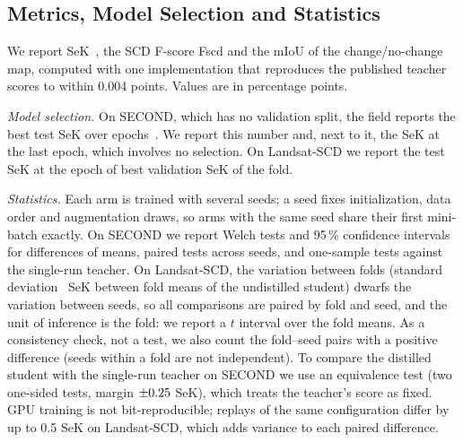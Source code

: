 \documentclass[journal]{IEEEtran}
\begin{document}
\subsection{Metrics, Model Selection and Statistics}
\label{sec:stats}
We report SeK~\cite{yang2022asymmetric}, the SCD F-score Fscd and the mIoU of the
change/no-change map, computed with one implementation that reproduces the published teacher
scores to within 0.004 points. Values are in percentage points.

\emph{Model selection.} On SECOND, which has no validation split, the field reports the best
test SeK over epochs~\cite{chen2024changemamba,shen2026foundation}. We report this number and,
next to it, the SeK at the last epoch, which involves no selection. On Landsat-SCD we report
the test SeK at the epoch of best validation SeK of the fold.

\emph{Statistics.} Each arm is trained with several seeds; a seed fixes initialization, data
order and augmentation draws, so arms with the same seed share their first mini-batch exactly.
On SECOND we report Welch tests and 95\,\% confidence intervals for differences of means, paired
tests across seeds, and one-sample tests against the single-run teacher. On Landsat-SCD, the
variation between folds (standard deviation \LFoldSd\ SeK between fold means of the
undistilled student) dwarfs the variation between seeds, so all comparisons are paired by fold
and seed, and the unit of inference is the fold: we report a $t$ interval over the fold means. As a
consistency check, not a test, we also count the fold--seed pairs with a positive difference
(seeds within a fold are not independent). To compare the distilled student with the single-run
teacher on SECOND we use an equivalence test (two one-sided tests, margin $\pm0.25$ SeK),
which treats the teacher's score as fixed. GPU training is not bit-reproducible; replays of the
same configuration differ by up to 0.5 SeK on Landsat-SCD, which adds variance to each paired
difference.
\end{document}
